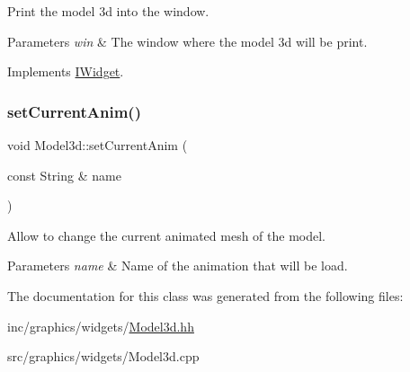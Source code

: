 Print the model 3d into the window. 


\begin{DoxyParams}{Parameters}
{\em win} & The window where the model 3d will be print. \\
\hline
\end{DoxyParams}


Implements \hyperlink{classIWidget_a0cfa49a402e9bb31808a715e048ab2f4}{I\+Widget}.

\mbox{\label{classModel3d_a29eeaa6769b0c21268f4704ac2d404b7}} 
\subsubsection{\texorpdfstring{set\+Current\+Anim()}{setCurrentAnim()}}
{\footnotesize\ttfamily void Model3d\+::set\+Current\+Anim (\begin{DoxyParamCaption}\item[{const String \&}]{name }\end{DoxyParamCaption})}



Allow to change the current animated mesh of the model. 


\begin{DoxyParams}{Parameters}
{\em name} & Name of the animation that will be load. \\
\hline
\end{DoxyParams}


The documentation for this class was generated from the following files\+:\begin{DoxyCompactItemize}
\item 
inc/graphics/widgets/\hyperlink{Model3d_8hh}{Model3d.\+hh}\item 
src/graphics/widgets/Model3d.\+cpp\end{DoxyCompactItemize}
